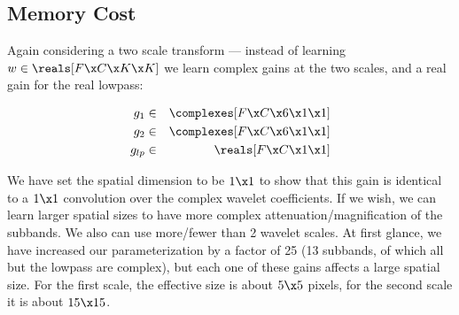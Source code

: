 \subsection{Memory Cost}

Again considering a two scale transform --- instead of learning $w\in \reals[F
\x C\x K\x K]$ we learn complex gains at the two scales, and a real gain for the
real lowpass:

$$
\begin{align}
  g_1 & \in & \complexes[F\x C\x 6\x 1\x 1] \\
  g_2 &\in &\complexes[F\x C\x 6\x 1\x 1] \\
  g_{lp} &\in & \reals[F\x C\x 1\x 1]
\end{align}
$$

We have set the spatial dimension to be $1\x 1$ to show that this gain is
identical to a $1\x 1$ convolution over the complex wavelet coefficients. If we
wish, we can learn larger spatial sizes to have more complex
attenuation/magnification of the subbands. We also can use more/fewer than
2 wavelet scales.  At first glance, we have increased our parameterization by
  a factor of 25 (13 subbands, of which all but the lowpass are complex), but
each one of these gains affects a large spatial size. For the first scale, the
effective size is about $5\x 5$ pixels, for the second scale it is about $15\x
15$.

\begin{figure}[]
  \centering
  \makebox[\textwidth][c]{%
    \resizebox{1.1\textwidth}{!}{}
  }
  \label{fig:fwd_bwd}
\end{figure}

